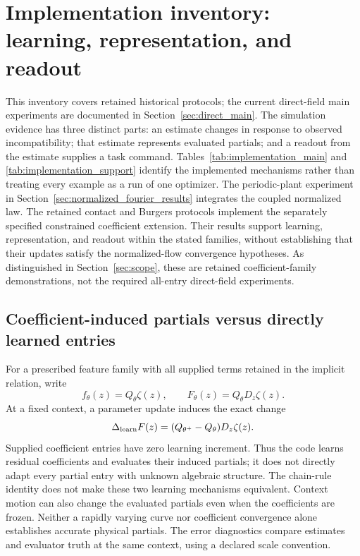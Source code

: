 \documentclass[journal]{IEEEtran}
\begin{document}
\section{Implementation inventory: learning, representation, and readout}
\label{sec:implementation_inventory}
This inventory covers retained historical protocols; the current direct-field
main experiments are documented in Section~\ref{sec:direct_main}.
The simulation evidence has three distinct parts: an estimate changes in
response to observed incompatibility; that estimate represents evaluated
partials; and a readout from the estimate supplies a task command.
Tables~\ref{tab:implementation_main} and
\ref{tab:implementation_support} identify the implemented mechanisms rather
than treating every example as a run of one optimizer. The periodic-plant
experiment in Section~\ref{sec:normalized_fourier_results} integrates the
coupled normalized law. The retained contact and Burgers protocols implement the separately
specified constrained coefficient extension. Their results support learning,
representation, and readout within the stated families, without establishing
that their updates satisfy the normalized-flow convergence hypotheses.
As distinguished in Section~\ref{sec:scope}, these are retained
coefficient-family demonstrations, not the required all-entry direct-field
experiments.

\subsection{Coefficient-induced partials versus directly learned entries}
For a prescribed feature family with all supplied terms retained in the
implicit relation, write
\begin{equation}
 f_\theta(z)=Q_\theta\zeta(z),\qquad
 F_\theta(z)=Q_\theta D_z\zeta(z).
 \label{eq:inventory_representation}
\end{equation}
At a fixed context, a parameter update induces the exact change
\begin{equation}
 \Delta_{\rm learn}F(z)
 =(Q_{\theta^+}-Q_\theta)D_z\zeta(z).
 \label{eq:inventory_partial_update}
\end{equation}
Supplied coefficient entries have zero learning increment. Thus the code
learns residual coefficients and evaluates their induced partials; it does
not directly adapt every partial entry with unknown algebraic structure.
The chain-rule identity does not make these two learning mechanisms
equivalent. Context motion
can also change the evaluated partials even when the coefficients are frozen.
Neither a rapidly varying curve nor coefficient convergence alone establishes
accurate physical partials. The error diagnostics compare estimates and
evaluator truth at the same context, using a declared scale convention.
\end{document}

